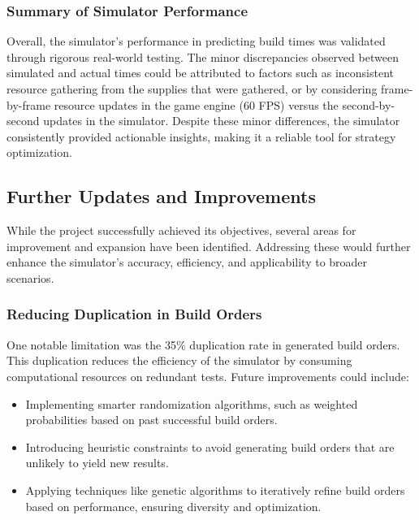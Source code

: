 \documentclass[a4paper, 12pt, english]{article}
\begin{document}
\subsubsection{Summary of Simulator Performance}
Overall, the simulator's performance in predicting build times was validated through rigorous real-world testing. The minor discrepancies observed between simulated and actual times could be attributed to factors such as inconsistent resource gathering from the supplies that were gathered, or by considering frame-by-frame resource updates in the game engine (60 FPS) versus the second-by-second updates in the simulator. Despite these minor differences, the simulator consistently provided actionable insights, making it a reliable tool for strategy optimization.
\newline


\subsection{Further Updates and Improvements}
While the project successfully achieved its objectives, several areas for improvement and expansion have been identified. Addressing these would further enhance the simulator's accuracy, efficiency, and applicability to broader scenarios.
\newline

\subsubsection{Reducing Duplication in Build Orders}
One notable limitation was the 35\% duplication rate in generated build orders. This duplication reduces the efficiency of the simulator by consuming computational resources on redundant tests. Future improvements could include:
    \begin{itemize}
    \item Implementing smarter randomization algorithms, such as weighted probabilities based on past successful build orders.
    \item Introducing heuristic constraints to avoid generating build orders that are unlikely to yield new results.
    \item Applying techniques like genetic algorithms to iteratively refine build orders based on performance, ensuring diversity and optimization.
    \end{itemize}
\end{document}
